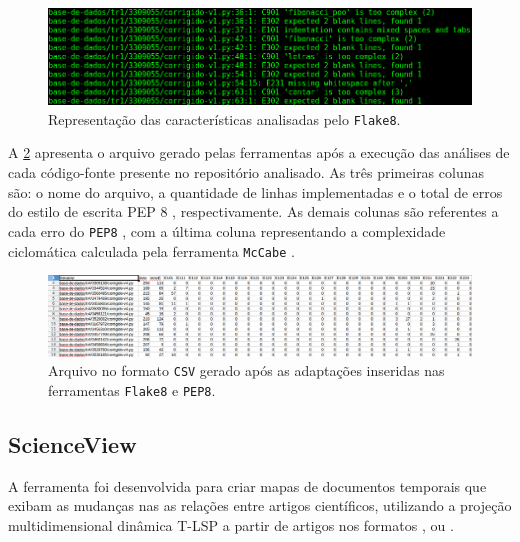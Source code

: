 			\begin{figure}[h]
				\centering
				\includegraphics[width=1\linewidth]{imagem/flake8}
				\caption{Representação das características analisadas pelo \texttt{Flake8}.}
				\label{fig:flake8}
			\end{figure}		

			A \cref{fig:arquivoCSV} apresenta o arquivo gerado pelas ferramentas após a
			execução das análises de cada código-fonte presente no repositório analisado.
			As três primeiras colunas são: o nome do arquivo, a quantidade de linhas implementadas
			e o total de erros do estilo de escrita PEP 8 \cite{van2001pep}, respectivamente. As
			demais colunas são referentes a cada erro do \texttt{PEP8} \cite{pep8}, com a última
			coluna representando a complexidade ciclomática calculada pela ferramenta
			\texttt{McCabe} \cite{mccabe}.

			\begin{figure}[h]
				\centering
				\includegraphics[width=1\linewidth]{imagem/arquivoCSV}
				\caption{Arquivo no formato \texttt{CSV} gerado após as adaptações inseridas nas ferramentas \texttt{Flake8} e \texttt{PEP8}.}
				\label{fig:arquivoCSV}
			\end{figure}
		

		\subsection{ScienceView}
		\label{sec:scienceView}
		
		A ferramenta  \cite{Alencar} foi desenvolvida para criar
		mapas de documentos temporais que exibam as mudanças nas as relações entre
		artigos científicos, utilizando a projeção multidimensional dinâmica \acs{T-LSP}
		a partir de artigos nos formatos , 
		ou .
		
